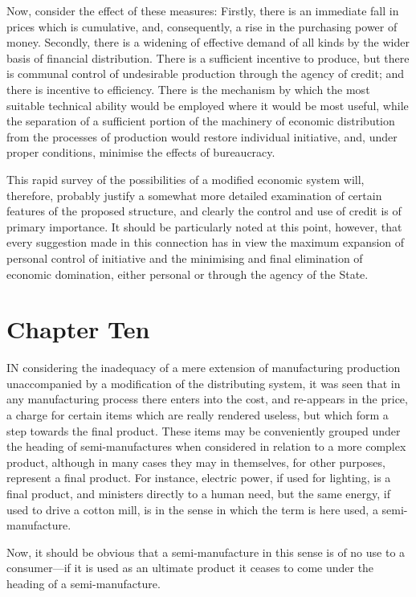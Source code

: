 \documentclass{book}
\begin{document}
Now, consider the effect of these measures: Firstly, there is an immediate fall in prices which is cumulative, and, consequently, a rise in the purchasing power of money. Secondly, there is a widening of effective demand of all kinds by the wider basis of financial distribution. There is a sufficient incentive to produce, but there is communal control of undesirable production through the agency of credit; and there is incentive to efficiency. There is the mechanism by which the most suitable technical ability would be employed where it would be most useful, while the separation of a sufficient portion of the machinery of economic distribution from the processes of production would restore individual initiative, and, under proper conditions, minimise the effects of bureaucracy.

This rapid survey of the possibilities of a modified economic system will, therefore, probably justify a somewhat more detailed examination of certain features of the proposed structure, and clearly the control and use of credit is of primary importance. It should be particularly noted at this point, however, that every suggestion made in this connection has in view the maximum expansion of personal control of initiative and the minimising and final elimination of economic domination, either personal or through the agency of the State.

\chapter{Chapter Ten}
\label{chapter-10}
IN considering the inadequacy of a mere extension of manufacturing production unaccompanied by a modification of the distributing system, it was seen that in any manufacturing process there enters into the cost, and re-appears in the price, a charge for certain items which are really rendered useless, but which form a step towards the final product. These items may be conveniently grouped under the heading of semi-manufactures when considered in relation to a more complex product, although in many cases they may in themselves, for other purposes, represent a final product. For instance, electric power, if used for lighting, is a final product, and ministers directly to a human need, but the same energy, if used to drive a cotton mill, is in the sense in which the term is here used, a semi-manufacture.

Now, it should be obvious that a semi-manufacture in this sense is of no use to a consumer—if it is used as an ultimate product it ceases to come under the heading of a semi-manufacture.
\end{document}
